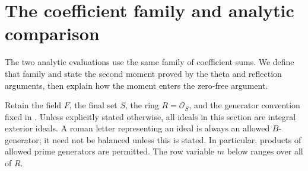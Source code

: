 \section{The coefficient family and analytic comparison}
\label{sec:coefficient-family}
\label{subsec:coefficient-family}

The two analytic evaluations use the same family of coefficient sums.  We
define that family and state the second moment proved by the theta and
reflection arguments, then explain how the moment enters the zero-free
argument.

Retain the field \(F\), the final set \(S\), the ring \(R=\mathcal O_S\),
and the generator convention fixed in .  Unless
explicitly stated otherwise, all ideals in this section are integral
exterior ideals.  A roman letter
representing an ideal is always an allowed \(B\)-generator; it need not be
balanced unless this is stated.  In particular, products of allowed prime
generators are permitted.  The row variable \(m\) below ranges over all of
\(R\).

